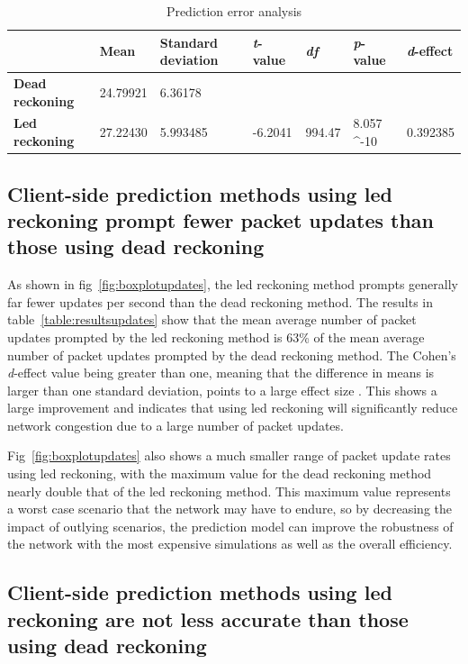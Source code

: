 \documentclass[journal]{IEEEtran}
\begin{document}
\begin{table}[t]
	\centering
	\caption{Prediction error analysis}
	\label{table:resultsaccuracy}
	\def\arraystretch{1.5}
	\begin{tabular}{|p{2.0cm}p{1.5cm}p{2.5cm}p{1.8cm}p{1.8cm}p{1.8cm}p{1.8cm}|}
		\hline
		& \textbf{Mean}
		& \textbf{Standard deviation}
		& \textbf{\textit{t}-value}
		& \textbf{\textit{df}}
		& \textbf{\textit{p}-value}
		& \textbf{\textit{d}-effect} \\ \hline
		\textbf{Dead reckoning}
		& 24.79921 
		& 6.36178
		&  
		&  
		& 
		&  \\
		\textbf{Led reckoning}
		& 27.22430  
		& 5.993485
		& -6.2041
		& 994.47
		& 8.057 \times 10^{-10} 
		& 0.392385 \\ \hline
	\end{tabular}
\end{table}

\subsection{Client-side prediction methods using led reckoning prompt fewer packet updates than those using dead reckoning}

As shown in fig~\ref{fig:boxplotupdates}, the led reckoning method prompts generally far fewer updates per second than the dead reckoning method. The results in table~\ref{table:resultsupdates} show that the mean average number of packet updates prompted by the led reckoning method is 63\% of the mean average number of packet updates prompted by the dead reckoning method. The Cohen's \textit{d}-effect value being greater than one, meaning that the difference in means is larger than one standard deviation, points to a large effect size \cite{cohen2013statistical}. This shows a large improvement and indicates that using led reckoning will significantly reduce network congestion due to a large number of packet updates.

Fig~\ref{fig:boxplotupdates} also shows a much smaller range of packet update rates using led reckoning, with the maximum value for the dead reckoning method nearly double that of the led reckoning method. This maximum value represents a worst case scenario that the network may have to endure, so by decreasing the impact of outlying scenarios, the prediction model can improve the robustness of the network with the most expensive simulations as well as the overall efficiency.

\subsection{Client-side prediction methods using led reckoning are not less accurate than those using dead reckoning} \label{resultsaccuracy}
\end{document}
